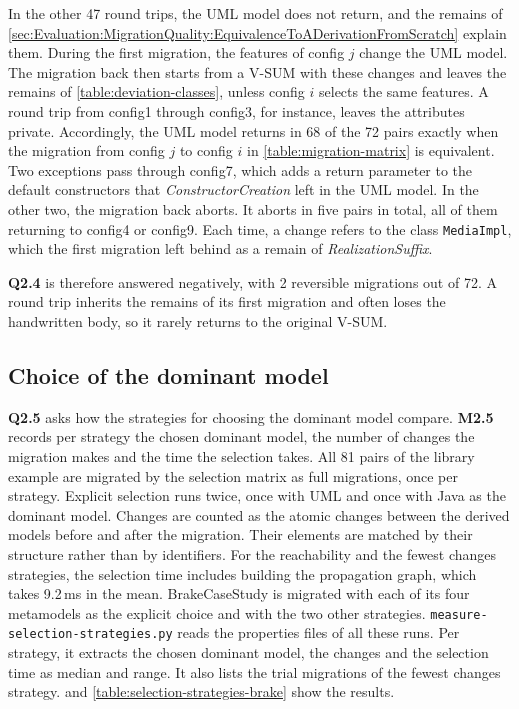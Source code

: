 In the other 47 round trips, the UML model does not return, and the remains of \autoref{sec:Evaluation:MigrationQuality:EquivalenceToADerivationFromScratch} explain them.
During the first migration, the features of config $j$ change the UML model.
The migration back then starts from a V-SUM with these changes and leaves the remains of \autoref{table:deviation-classes}, unless config $i$ selects the same features.
A round trip from config1 through config3, for instance, leaves the attributes private.
Accordingly, the UML model returns in 68 of the 72 pairs exactly when the migration from config $j$ to config $i$ in \autoref{table:migration-matrix} is equivalent.
Two exceptions pass through config7, which adds a return parameter to the default constructors that \textit{ConstructorCreation} left in the UML model.
In the other two, the migration back aborts.
It aborts in five pairs in total, all of them returning to config4 or config9.
Each time, a change refers to the class \texttt{MediaImpl}, which the first migration left behind as a remain of \textit{RealizationSuffix}.

\textbf{Q2.4} is therefore answered negatively, with 2 reversible migrations out of 72.
A round trip inherits the remains of its first migration and often loses the handwritten body, so it rarely returns to the original V-SUM.

\subsection{Choice of the dominant model}
\label{sec:Evaluation:MigrationQuality:ChoiceOfTheDominantModel}

\textbf{Q2.5} asks how the strategies for choosing the dominant model compare.
\textbf{M2.5} records per strategy the chosen dominant model, the number of changes the migration makes and the time the selection takes.
All 81 pairs of the library example are migrated by the selection matrix as full migrations, once per strategy.
Explicit selection runs twice, once with UML and once with Java as the dominant model.
Changes are counted as the atomic changes between the derived models before and after the migration.
Their elements are matched by their structure rather than by identifiers.
For the reachability and the fewest changes strategies, the selection time includes building the propagation graph, which takes 9.2\,ms in the mean.
BrakeCaseStudy is migrated with each of its four metamodels as the explicit choice and with the two other strategies.
\texttt{measure-selection-strategies.py} reads the properties files of all these runs.
Per strategy, it extracts the chosen dominant model, the changes and the selection time as median and range.
It also lists the trial migrations of the fewest changes strategy.
 and \autoref{table:selection-strategies-brake} show the results.

